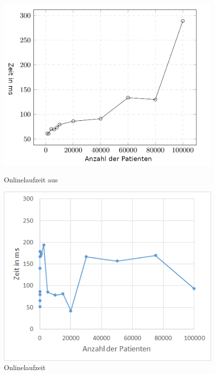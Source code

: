 \documentclass[german,version-2020-11]{uzl-thesis}
\begin{document}
	\begin{figure}[ht]
	\begin{minipage}{.5\textwidth}
		\centering
		\includegraphics[width=0.9\linewidth]{assets/paperLaufzeit.PNG}
		\caption{Onlinelaufzeit aus \cite{guarnieri2017securing}}
		\label{fig:paperlaufzeit}
	\end{minipage}
	\begin{minipage}{.5\textwidth}
		\centering
		\includegraphics[width=0.9\linewidth]{assets/onlineSkript.png}
		\caption{Onlinelaufzeit}
		\label{fig:unserelaufzeit}
	\end{minipage}
\end{figure}
\end{document}
